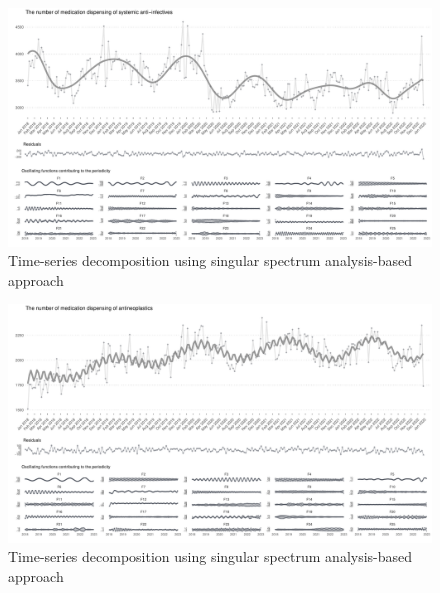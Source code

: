 \documentclass[
  letterpaper,
  DIV=11,
  numbers=noendperiod]{scrartcl}
\begin{document}
\begin{figure}[H]

{\centering \includegraphics[width=1\linewidth,height=\textheight,keepaspectratio]{supplementary_files/figure-pdf/unnamed-chunk-2-7.pdf}

}

\caption{Time-series decomposition using singular spectrum
analysis-based approach}

\end{figure}%

\begin{figure}[H]

{\centering \includegraphics[width=1\linewidth,height=\textheight,keepaspectratio]{supplementary_files/figure-pdf/unnamed-chunk-2-8.pdf}

}

\caption{Time-series decomposition using singular spectrum
analysis-based approach}

\end{figure}%
\end{document}
